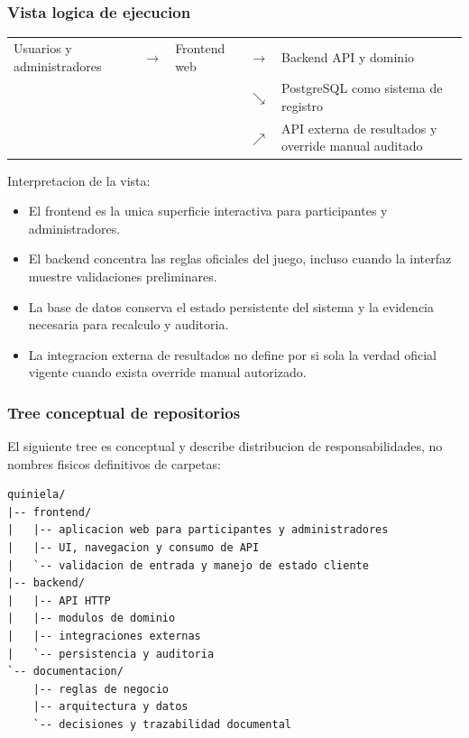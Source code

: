 \subsubsection{Vista logica de ejecucion}

\begin{docnote}
\small
\begin{tabularx}{\textwidth}{>{\raggedright\arraybackslash}p{} >{\centering\arraybackslash}p{} >{\raggedright\arraybackslash}p{} >{\centering\arraybackslash}p{} >{\raggedright\arraybackslash}p{}}
Usuarios y administradores & $\rightarrow$ & Frontend web & $\rightarrow$ & Backend API y dominio \\
 &  &  & $\searrow$ & PostgreSQL como sistema de registro \\
 &  &  & $\nearrow$ & API externa de resultados y override manual auditado \\
\end{tabularx}
\end{docnote}

Interpretacion de la vista:

\begin{itemize}
  \item El frontend es la unica superficie interactiva para participantes y administradores.
  \item El backend concentra las reglas oficiales del juego, incluso cuando la interfaz muestre validaciones preliminares.
  \item La base de datos conserva el estado persistente del sistema y la evidencia necesaria para recalculo y auditoria.
  \item La integracion externa de resultados no define por si sola la verdad oficial vigente cuando exista override manual autorizado.
\end{itemize}

\subsubsection{Tree conceptual de repositorios}

El siguiente tree es conceptual y describe distribucion de responsabilidades, no nombres fisicos definitivos de carpetas:

\begin{verbatim}
quiniela/
|-- frontend/
|   |-- aplicacion web para participantes y administradores
|   |-- UI, navegacion y consumo de API
|   `-- validacion de entrada y manejo de estado cliente
|-- backend/
|   |-- API HTTP
|   |-- modulos de dominio
|   |-- integraciones externas
|   `-- persistencia y auditoria
`-- documentacion/
    |-- reglas de negocio
    |-- arquitectura y datos
    `-- decisiones y trazabilidad documental
\end{verbatim}

